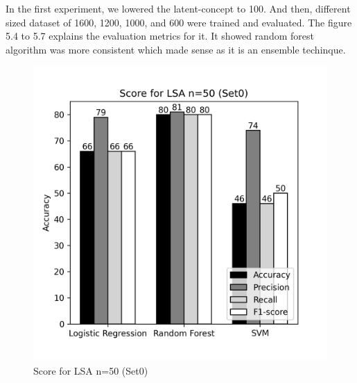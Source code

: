 \documentclass[12pt]{report}
\begin{document}
             In the first experiment, we lowered the latent-concept to 100. And then, different sized dataset of 1600, 1200, 1000, and 600 were 
             trained and evaluated. The figure 5.4 to 5.7 explains the evaluation metrics for it. It showed random forest algorithm 
             was more consistent which made sense as it is an ensemble techinque. 


             
             \begin{figure}[!htb]
                \begin{minipage}{0.48\textwidth}
                  \centering
                  \includegraphics[scale=0.55]{plots/Score for LSA n=50 (Set0).png}
                  \caption{Score for LSA n=50 (Set0)}\label{Fig:typo1}
                \end{minipage}\hfill
                \begin{minipage}{0.48\textwidth}
                  \centering

\end{minipage}
\end{figure}
\end{document}

